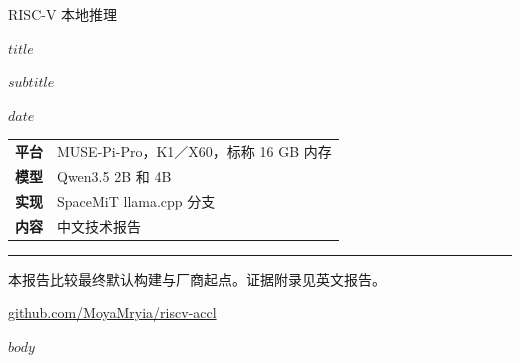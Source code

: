 \documentclass[10pt,a4paper,fontset=none]{ctexart}
\begin{document}
\begin{titlepage}
\vspace*{15mm}
{\large\textcolor{reportblue}{RISC-V 本地推理}}\par
\vspace{12mm}
{\Huge\bfseries $title$\par}
\vspace{8mm}
{\Large $subtitle$\par}
\vspace{12mm}
{\large $date$\par}
\vspace{14mm}
\begin{tabular}{@{}ll@{}}
\textbf{平台} & MUSE-Pi-Pro，K1／X60，标称 16 GB 内存 \\
\textbf{模型} & Qwen3.5 2B 和 4B \\
\textbf{实现} & SpaceMiT llama.cpp 分支 \\
\textbf{内容} & 中文技术报告 \\
\end{tabular}
\vfill
\textcolor{reportblue}{\rule{\textwidth}{1pt}}\par
本报告比较最终默认构建与厂商起点。证据附录见英文报告。\par
\vspace{6mm}
\href{https://github.com/MoyaMryia/riscv-accl}{github.com/MoyaMryia/riscv-accl}
\end{titlepage}
{\small\tableofcontents}
\clearpage
$body$
\end{document}
